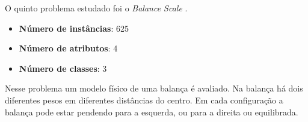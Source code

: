 O quinto problema estudado foi o \emph{Balance Scale} \cite{bib-balance-scale}.

\begin{itemize}	
	\item \textbf{Número de instâncias}: 625
	\item \textbf{Número de atributos}: 4
	\item \textbf{Número de classes}: 3
\end{itemize}

Nesse problema um modelo físico de uma balança é avaliado. Na balança há dois diferentes pesos em diferentes distâncias do centro. Em cada configuração a balança pode estar pendendo para a esquerda, ou para a direita ou equilibrada. 